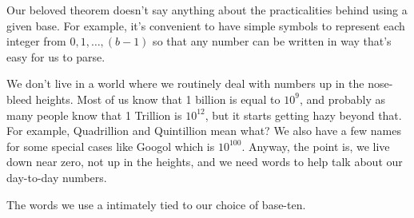 \documentclass{article}
\begin{document}
Our beloved theorem doesn't say anything about the practicalities behind
using a given base. For example, it's convenient to have 
simple symbols to represent each integer from \(0, 1, \dots{}, (b-1)\) so
that any number can be written in way that's easy for us to parse.

We don't live in a world where we routinely deal with numbers up in the nose-bleed
heights. Most of us know that 1 billion is equal to \(10^9\), and probably as many
people know that 1 Trillion is \(10^12\), but it starts getting hazy beyond that.
For example, Quadrillion and Quintillion mean what?
We also have a few names for some special cases like Googol which is \(10^100\).
Anyway, the point is, we live
down near zero, not up in the heights, and we need words to help talk about our
day-to-day numbers.

The words we use a intimately tied to our choice of base-ten.
\end{document}
